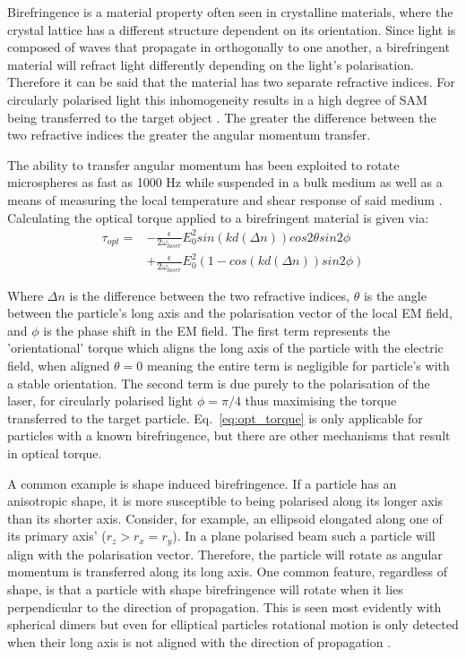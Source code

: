 Birefringence is a material property often seen in crystalline 
materials, where the crystal lattice has a different structure 
dependent on its orientation. Since light is composed of waves 
that propagate in orthogonally to one another, a birefringent 
material will refract light differently depending on the light's 
polarisation. Therefore it can be said that the material has 
two separate refractive indices. For circularly polarised light 
this inhomogeneity results in a high degree of SAM being 
transferred to the target object \cite{Parkin2009, Arita2016}. 
The greater the difference between the two refractive indices the 
greater the angular momentum transfer.

The ability to transfer angular momentum has been exploited 
to rotate microspheres as fast as 1000 Hz while suspended 
in a bulk medium \cite{Arita2016} as well as a means of 
measuring the local temperature and shear response of said 
medium \cite{Millen2014, RodriguezSevilla2018}. Calculating 
the optical torque applied to a birefringent material is given 
via:
\begin{equation}
	\label{eq:opt_torque}
	\begin{aligned}
		\tau_{opt} =& -\frac{\epsilon}{2\omega_{laser}}E_0^2sin(kd(\Delta n))cos2\theta sin2\phi 
		\\ &+  \frac{\epsilon}{2\omega_{laser}}E_0^2 (1-cos(kd(\Delta n))sin2\phi)
	\end{aligned}
\end{equation}

Where $\Delta n$ is the difference between the two refractive 
indices, $\theta$ is the angle between the particle's long 
axis and the polarisation vector of the local EM field, and 
$\phi$ is the phase shift in the EM field. The first term 
represents the 'orientational' torque which aligns the long 
axis of the particle with the electric field, when aligned 
$\theta=0$ meaning the entire term is negligible for particle's 
with a stable orientation. The second term is due purely to the 
polarisation of the laser, for circularly polarised light 
$\phi=\pi/4$ thus maximising the torque transferred to the 
target particle. Eq.~\eqref{eq:opt_torque} is only applicable 
for particles with a known birefringence, but there are other 
mechanisms that result in optical torque.

A common example is shape induced birefringence. If a particle 
has an anisotropic shape, it is more susceptible to being 
polarised along its longer axis than its shorter axis. Consider, 
for example, an ellipsoid elongated along one of its primary 
axis' ($r_z > r_x = r_y$). In a plane polarised beam such a 
particle will align with the polarisation vector. Therefore, 
the particle will rotate as angular momentum is transferred 
along its long axis. One common feature, regardless of shape,
is that a particle with shape birefringence will rotate when 
it lies perpendicular to the direction of propagation. This 
is seen most evidently with spherical dimers \cite{Ahn2018, 
Reimann2018} but even for elliptical particles rotational 
motion is only detected when their long axis is not aligned 
with the direction of propagation \cite{Zhu2021, Mihiretie2014}.

